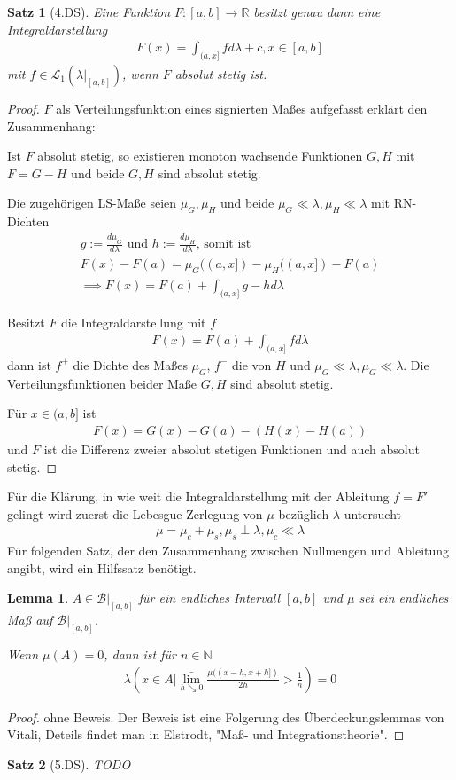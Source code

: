 \documentclass[]{article}
\newtheorem{theorem}{Satz}
\newtheorem{lemma}{Lemma}
\begin{document}
\begin{theorem}[4.DS]
	Eine Funktion $F:[a,b]\rightarrow \mathbb{R}$ besitzt genau dann eine Integraldarstellung
	\begin{align*}
		F(x) = \int_{(a,x]} f d\lambda + c, x \in [a,b]
	\end{align*}
	mit $f \in \mathcal{L}_1(\lambda|_{[a,b]})$, wenn $F$ absolut stetig ist.
\end{theorem}
\begin{proof}
	$F$ als Verteilungsfunktion eines signierten Maßes aufgefasst erklärt den Zusammenhang:
	
	Ist $F$ absolut stetig, so existieren monoton wachsende Funktionen $G,H$ mit $F=G-H$ und beide $G,H$ sind absolut stetig.
	
	Die zugehörigen LS-Maße seien $\mu_G,\mu_H$ und beide $\mu_G \ll \lambda, \mu_H \ll \lambda$ mit RN-Dichten
	\begin{align*}
		g:=\frac{d\mu_G}{d\lambda} \text{ und } h := \frac{d\mu_H}{d\lambda} \text{, somit ist}\\
		F(x) - F(a) = \mu_G((a,x]) - \mu_H((a,x]) - F(a)\\
		\implies F(x) = F(a) + \int_{(a,x]} g-h d\lambda
	\end{align*}

	Besitzt $F$ die Integraldarstellung mit $f$
	\begin{align*}
		F(x) = F(a) + \int_{(a,x]} f d\lambda
	\end{align*}
	dann ist $f^+$ die Dichte des Maßes $\mu_G$, $f^-$ die von $H$ und $\mu_G \ll \lambda, \mu_G \ll \lambda$. Die Verteilungsfunktionen beider Maße $G,H$ sind absolut stetig.
	
	Für $x \in (a,b]$ ist
	\begin{align*}
		F(x) = G(x) - G(a) - (H(x) - H(a))
	\end{align*}
	und $F$ ist die Differenz zweier absolut stetigen Funktionen und auch absolut stetig.
\end{proof}

Für die Klärung, in wie weit die Integraldarstellung mit der Ableitung $f=F'$ gelingt wird zuerst die Lebesgue-Zerlegung von $\mu$ bezüglich $\lambda$ untersucht
\begin{align*}
	\mu = \mu_c + \mu_s, \mu_s \perp \lambda, \mu_c \ll \lambda
\end{align*}
Für folgenden Satz, der den Zusammenhang zwischen Nullmengen und Ableitung angibt, wird ein Hilfssatz benötigt.

\begin{lemma}
	$A \in \mathcal{B}|_{[a,b]}$ für ein endliches Intervall $[a,b]$ und $\mu$ sei ein endliches Maß auf $\mathcal{B}|_{[a,b]}$.
	
	Wenn $\mu(A) = 0$, dann ist für $n \in \mathbb{N}$
	\begin{align*}
		\lambda\left( x\in A \big| \bar{\lim_{h \searrow 0}} \frac{\mu((x-h,x+h])}{2h} > \frac{1}{n} \right) = 0
	\end{align*}
\end{lemma}

\begin{proof}
	ohne Beweis. Der Beweis ist eine Folgerung des Überdeckungslemmas von Vitali, Deteils findet man in Elstrodt, "Maß- und Integrationstheorie".
\end{proof}

\begin{theorem}[5.DS]
	TODO
\end{theorem}
\end{document}
